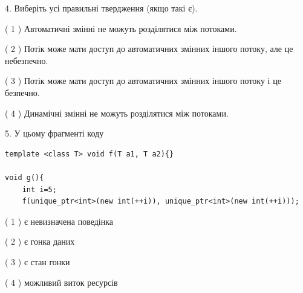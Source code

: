 \documentclass[12pt, ukrainian]{article}
\begin{document}
\begin {large}
{%
4. Виберіть усі правильні твердження (якщо такі є).\par
\vspace{2mm}

( 1 ) Автоматичні змінні не можуть розділятися між потоками.%

( 2 ) Потік може мати доступ до автоматичних змінних іншого потоку, але це небезпечно.%

( 3 ) Потік може мати доступ до автоматичних змінних іншого потоку і це безпечно.%

( 4 ) Динамічні змінні не можуть розділятися між потоками.%


5. У цьому фрагменті коду
\begin{verbatim}
template <class T> void f(T a1, T a2){}

void g(){
    int i=5;
    f(unique_ptr<int>(new int(++i)), unique_ptr<int>(new int(++i)));
\end{verbatim}

( 1 ) є невизначена поведінка%

( 2 ) є гонка даних%

( 3 ) є стан гонки%

( 4 ) можливий виток ресурсів%
}
\end {large}
\end{document}
